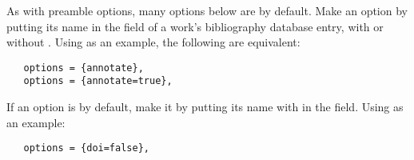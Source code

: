 \documentclass[11pt,letterpaper,oneside]{article}
\begin{document}
As with preamble options, many options below are  by
default. Make an option  by putting its name in the
 field of a work's bibliography database entry, with
or without . Using  as an example, the
following are equivalent:

\begin{verbatim}
   options = {annotate},
   options = {annotate=true},
\end{verbatim}

If an option is  by default, make it  by putting
its name with  in the  field. Using
 as an example:

\begin{verbatim}
   options = {doi=false},
\end{verbatim}
\end{document}

